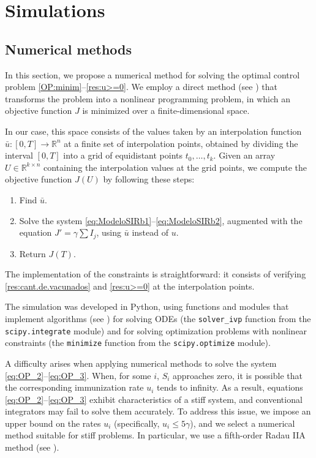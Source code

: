 \documentclass[a4paper,10pt]{article}
\theoremstyle{remark}
\begin{document}
\section{Simulations}


\subsection{Numerical methods}
In this section, we propose a numerical method for solving the optimal control problem \eqref{OP:minim}--\eqref{res:u>=0}. We employ a direct method (see \cite{rao2009survey}) that transforms the problem  into a nonlinear programming problem, in which an objective function $J$ is minimized over a finite-dimensional space.

In our case, this space consists of the values taken by an interpolation function $\bar{u}:[0,T]\to\mathbb{R}^n$ at a finite set of interpolation points, obtained by dividing the interval $[0,T]$ into a grid of equidistant points ${t_0,\ldots,t_k}$. Given an array $U\in\mathbb{R}^{k\times n}$ containing the interpolation values at the grid points, we compute the objective function $J(U)$ by following these steps:

\begin{enumerate}
\item Find $\bar{u}$.
\item Solve the system \eqref{eq:ModeloSIRb1}--\eqref{eq:ModeloSIRb2}, augmented with the equation $J'=\gamma\sum I_j$, using $\bar{u}$ instead of $u$.
\item Return $J(T)$.
\end{enumerate}

The implementation of the constraints  is straightforward: it consists of verifying \eqref{res:cant.de.vacunados}  and \eqref{res:u>=0} at the interpolation points.

The simulation was developed in Python, using functions and modules that implement algorithms (see \cite{2020SciPy-NMeth}) for solving ODEs (the \texttt{solver\_ivp} function from the \texttt{scipy.integrate} module) and for solving optimization problems with nonlinear constraints (the \texttt{minimize} function from the \texttt{scipy.optimize} module).




A difficulty arises when applying numerical methods to solve the system \eqref{eq:OP_2}--\eqref{eq:OP_3}. When, for some $i$, $S_i$ approaches zero, it is possible that the corresponding immunization rate $u_i$ tends to infinity. As a result,  equations \eqref{eq:OP_2}--\eqref{eq:OP_3} exhibit characteristics of a stiff system, and conventional integrators may fail to solve them accurately. To address this issue, we impose an upper bound on the rates $u_i$ (specifically, $u_i\leq 5\gamma$), and we select a numerical method suitable for stiff problems. In particular, we use a fifth-order Radau IIA method (see \cite{ErnstHairer1546}).
\end{document}
